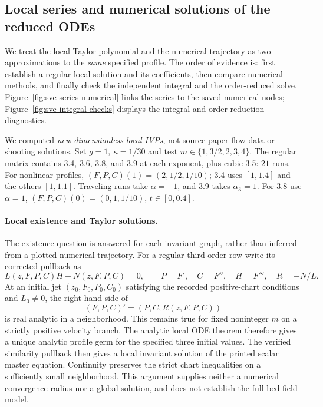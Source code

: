 \subsection{Local series and numerical solutions of the reduced ODEs}
We treat the local Taylor polynomial and the numerical trajectory as two
approximations to the \emph{same} specified profile. The order of evidence is:
first establish a regular local solution and its coefficients, then compare
numerical methods, and finally check the independent integral and the
order-reduced solve. Figure~\ref{fig:sve-series-numerical} links the series to
the saved numerical nodes; Figure~\ref{fig:sve-integral-checks} displays the
integral and order-reduction diagnostics.

We computed \emph{new dimensionless local IVPs}, not source-paper flow data
or shooting solutions. Set $g=1$, $\kappa=1/30$ and test
$m\in\{1,3/2,2,3,4\}$. The regular matrix contains 3.4, 3.6, 3.8,
and 3.9 at each exponent, plus cubic 3.5: $21$ runs. For nonlinear
profiles, $(F,P,C)(1)=(2,1/2,1/10)$; 3.4 uses $[1,1.4]$ and the
others $[1,1.1]$. Traveling runs take $\alpha=-1$, and 3.9 takes
$\alpha_3=1$. For 3.8 use $\alpha=1$,
$(F,P,C)(0)=(0,1,1/10)$, $t\in[0,0.4]$.

\paragraph{Local existence and Taylor solutions.}
The existence question is answered for each invariant graph, rather than
inferred from a plotted numerical trajectory. For a regular third-order row
write its corrected pullback as
\[
 L(z,F,P,C)H+N(z,F,P,C)=0,\qquad
 P=F',\quad C=F'',\quad H=F''',\quad R=-N/L.
\]
At an initial jet $(z_0,F_0,P_0,C_0)$ satisfying the recorded positive-chart
conditions and $L_0\ne0$, the right-hand side of
\[
 (F,P,C)'=(P,C,R(z,F,P,C))
\]
is real analytic in a neighborhood. This remains true for fixed noninteger
$m$ on a strictly positive velocity branch. The analytic local ODE theorem
\cite[Section~4.1]{teschl2012}
therefore gives a unique analytic profile germ for the specified three
initial values. The verified similarity pullback then gives a local invariant
solution of the printed scalar master equation. Continuity preserves the
strict chart inequalities on a sufficiently small neighborhood. This
argument supplies neither a numerical convergence radius nor a global
solution, and does not establish the full bed-field model.


